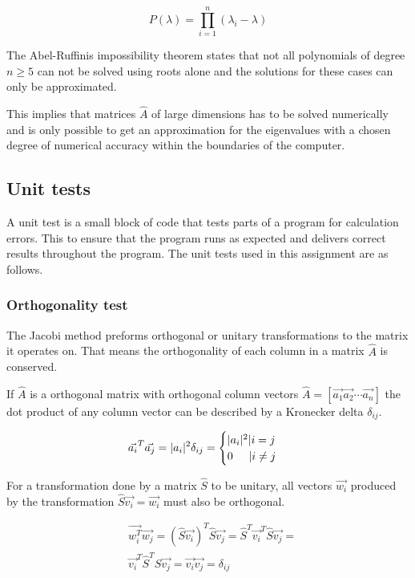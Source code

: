 \documentclass[twoside,twocolumn]{article}
\newcommand{\nl}{
	
	\medskip
	\noindent
}
\begin{document}
	\begin{equation*}
	P(\lambda) = \prod_{i=1}^n(\lambda_i - \lambda)
	\end{equation*}
	
	\noindent
	The Abel-Ruffinis impossibility theorem states that not all polynomials of degree $n\geq 5$ can not be solved using roots alone and the solutions for these cases can only be approximated. \citep{compfys}
	\nl
	This implies that matrices $\hat{A}$ of large dimensions has to be solved numerically and is only possible to get an approximation for the eigenvalues with a chosen degree of numerical accuracy within the boundaries of the computer.
	
	\subsection{Unit tests}
	A unit test is a small block of code that tests parts of a program for calculation errors. This to ensure that the program runs as expected and delivers correct results throughout the program.
The unit tests used in this assignment are as follows.
	
	\subsubsection{Orthogonality test}
	
	The Jacobi method preforms orthogonal or unitary transformations to the matrix it operates on. That means the orthogonality of each column in a matrix $\hat{A}$ is conserved.\nl
	
	If $\hat{A}$ is a orthogonal matrix with orthogonal column vectors $\hat{A} = [\vec{a_1} \vec{a_2} \cdots \vec{a_n}  ]$ the dot product of any column vector can be described by a Kronecker delta $\delta_{ij}$.
	
	\begin{align*}
	\vec{a_i}^T \vec{a_j} = |a_i|^2\delta_{ij} =
	\begin{cases}
	|a_i|^2|i=j\\
	0\hspace{0.5cm}|i\neq j
	\end{cases}
	\end{align*}
	
	For a transformation done by a matrix $\hat{S}$ to be unitary, all vectors $\vec{w_i}$ produced by the transformation $\hat{S}\vec{v_i} = \vec{w_i}$ must also be orthogonal.
	
	\begin{align*}
	&\vec{w_i^T}\vec{w_j} = (\hat{S}\vec{v_i})^T\hat{S}\vec{v_j} = \hat{S}^T\vec{v_i}^T\hat{S}\vec{v_j} = \\ &\vec{v_i}^T\hat{S}^T\hat{S}\vec{v_j} = \vec{v_i}\vec{v_j} = \delta_{ij}
	\end{align*}
	
\end{document}
